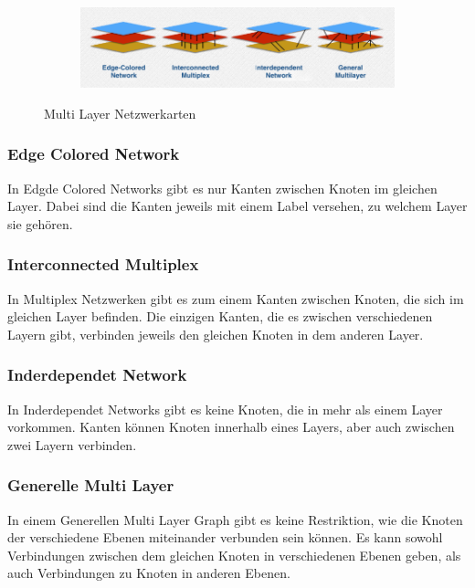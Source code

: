 \begin{figure}
  \centering
  \begin{subfigure}[b]{1.0\textwidth}
    \includegraphics[width=1.0\linewidth]{img/network_types.png}
  \end{subfigure}
  \caption{Multi Layer Netzwerkarten}
  \label{network_types}
\end{figure}

\subsubsection{Edge Colored Network}

In Edgde Colored Networks gibt es nur Kanten zwischen Knoten im gleichen Layer. Dabei sind die Kanten jeweils mit einem Label versehen, zu welchem Layer sie gehören.


\subsubsection{Interconnected Multiplex}

In Multiplex Netzwerken gibt es zum einem Kanten zwischen Knoten, die sich im gleichen Layer befinden. Die einzigen Kanten, die es zwischen verschiedenen Layern gibt, verbinden jeweils den gleichen Knoten in dem anderen Layer. 

\subsubsection{Inderdependet Network}

In Inderdependet Networks gibt es keine Knoten, die in mehr als einem Layer vorkommen. Kanten können Knoten innerhalb eines Layers, aber auch zwischen zwei Layern verbinden.

\subsubsection{Generelle Multi Layer}
In einem Generellen Multi Layer Graph gibt es keine Restriktion, wie die Knoten der verschiedene Ebenen miteinander verbunden sein können. Es kann sowohl Verbindungen zwischen dem gleichen Knoten in verschiedenen Ebenen geben, als auch Verbindungen zu Knoten in anderen Ebenen.


